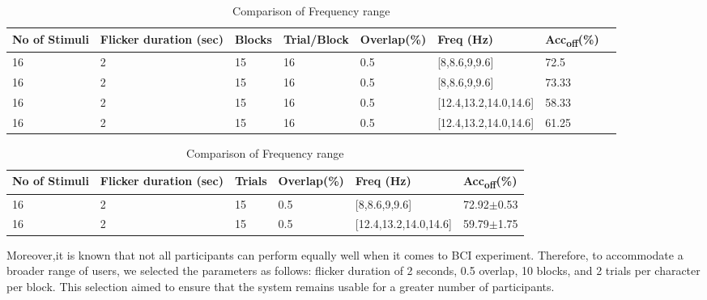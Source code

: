 \begin{table}[ht]
\small
\caption{Comparison of Frequency range}
\label{tab:comparison_freq_range}
\begin{tabular}{@{}p{1.2cm} p{1.5cm} p{1.0cm} p{1.8cm} p{1.8cm} p{3.5cm} p{1.5cm} p{1.5cm}@{}}
\toprule
No of Stimuli & Flicker   duration (sec) & Blocks & Trial/Block & Overlap(\%) & Freq (Hz)              & Acc\textsubscript{off}(\%)     \\ \midrule
16            & 2                        & 15           & 16                      & 0.5                     & {[}8,8.6,9,9.6{]}             & 72.5                        \\
16            & 2                        & 15           & 16                      & 0.5                     & {[}8,8.6,9,9.6{]}             & 73.33                      \\
16            & 2                        & 15           & 16                      & 0.5                     & {[}12.4,13.2,14.0,14.6{]}     & 58.33                     \\
16            & 2                        & 15           & 16                      & 0.5                     & {[}12.4,13.2,14.0,14.6{]}     & 61.25                      \\ \bottomrule
\end{tabular}
\end{table}


\begin{table}[ht]
\small
\caption{Comparison of Frequency range}
\label{tab:comparison_freq_range}
\begin{tabular}{@{}p{1.2cm} p{2.5cm} p{1.8cm} p{1.8cm} p{4cm} p{2.5cm}@{}}
\toprule
No of Stimuli & Flicker duration (sec) & Trials & Overlap(\%) & Freq (Hz)              & Acc\textsubscript{off}(\%)     \\ \midrule
16             & 2                      & 15        & 0.5         & {[}8,8.6,9,9.6{]}             & 72.92$\pm$0.53 \\
16            & 2                      & 15        & 0.5       &{[}12.4,13.2,14.0,14.6{]}             & 59.79$\pm$1.75\\
\bottomrule
\end{tabular}
\end{table}

Moreover,it is known that not all participants can perform equally well when it comes to BCI experiment. Therefore, to accommodate a broader range of users, we selected the parameters as follows: flicker duration of 2 seconds, 0.5 overlap, 10 blocks, and 2 trials per character per block. This selection aimed to ensure that the system remains usable for a greater number of participants.

